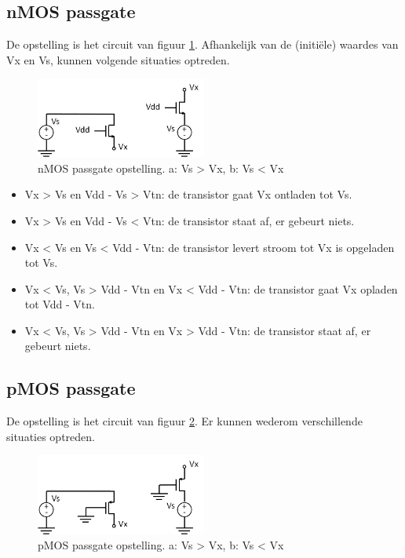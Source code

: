 \subsection{nMOS passgate}
De opstelling is het circuit van figuur \ref{fig:passgate1}. Afhankelijk van de (initiële) waardes van Vx en Vs, kunnen volgende situaties optreden.

\begin{figure}[h!]
  \centering
  \includegraphics[width=0.5\textwidth]{../fig/hfdst-periphery-passgate1.png}
  \caption{nMOS passgate opstelling. a: Vs > Vx, b: Vs < Vx}
  \label{fig:passgate1}
\end{figure}

\begin{itemize}
\item Vx > Vs en Vdd - Vs > Vtn: de transistor gaat Vx ontladen tot Vs.
\item Vx > Vs en Vdd - Vs < Vtn: de transistor staat af, er gebeurt niets.
\item Vx < Vs en Vs < Vdd - Vtn: de transistor levert stroom tot Vx is opgeladen tot Vs.
\item Vx < Vs, Vs > Vdd - Vtn en Vx < Vdd - Vtn: de transistor gaat Vx opladen tot Vdd - Vtn.
\item Vx < Vs, Vs > Vdd - Vtn en Vx > Vdd - Vtn: de transistor staat af, er gebeurt niets.
\end{itemize}

\subsection{pMOS passgate}
De opstelling is het circuit van figuur \ref{fig:passgate2}. Er kunnen wederom verschillende situaties optreden.

\begin{figure}[h!]
  \centering
  \includegraphics[width=0.5\textwidth]{../fig/hfdst-periphery-passgate2.png}
  \caption{pMOS passgate opstelling. a: Vs > Vx, b: Vs < Vx}
  \label{fig:passgate2}
\end{figure}

